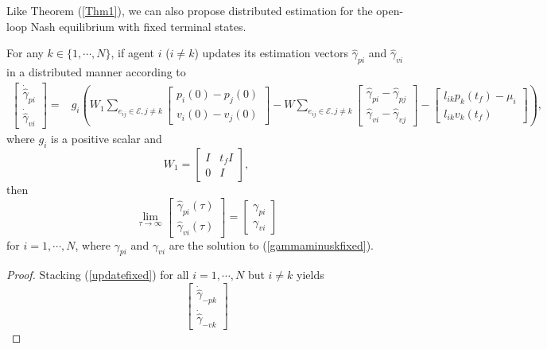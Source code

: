 \documentclass[12pt,draftcls,onecolumn]{IEEEtran}  %
\begin{document}
{Like Theorem (\ref{Thm1}), we can also propose distributed estimation for the open-loop Nash equilibrium with fixed terminal states.
\begin{thm}
For any $k\in\{1,\cdots,N\}$, if agent $i$ ($i\neq k$) updates its estimation vectors $\hat{\gamma}_{pi}$ and $\hat{\gamma}_{vi}$ in a distributed manner according to
\begin{align}
\begin{bmatrix}
\dot{\hat{\gamma}}_{pi}\\
\dot{\hat{\gamma}}_{vi}
\end{bmatrix}=&g_i\left( W_1\sum_{e_{ij}\in\mathcal{E},j\neq k}
\begin{bmatrix}
p_i(0)-p_j(0)\\
v_i(0)-v_j(0)
\end{bmatrix}
-W\sum_{e_{ij}\in\mathcal{E},j\neq k}\begin{bmatrix}
\hat{\gamma}_{pi}-\hat{\gamma}_{pj}\\
\hat{\gamma}_{vi}-\hat{\gamma}_{vj}
\end{bmatrix}
-\begin{bmatrix}
l_{ik}p_k(t_f)-\mu_{i}\\
l_{ik}v_k(t_f)
\end{bmatrix}\right),\label{updatefixed}
\end{align}
where $g_i$ is a positive scalar and
\[W_1=\begin{bmatrix}
I&t_fI\\
0&I
\end{bmatrix},\]
then
\begin{equation}
\lim_{\tau\rightarrow\infty}\begin{bmatrix}
\hat{\gamma}_{pi}(\tau)\\
\hat{\gamma}_{vi}(\tau)
\end{bmatrix}=\begin{bmatrix}
\gamma_{pi}\\
\gamma_{vi}
\end{bmatrix}
\label{limitfixed}
\end{equation}
for $i=1,\cdots,N$, where $\gamma_{pi}$ and $\gamma_{vi}$ are the solution to (\ref{gammaminuskfixed}).
\end{thm}
\begin{proof}
Stacking (\ref{updatefixed}) for all $i=1,\cdots,N$ but $i\neq k$ yields
\begin{equation}
\begin{bmatrix}
\dot{\hat{\gamma}}_{-pk}\\
\dot{\hat{\gamma}}_{-vk}

\end{bmatrix}
\end{equation}
\end{proof}}
\end{document}

